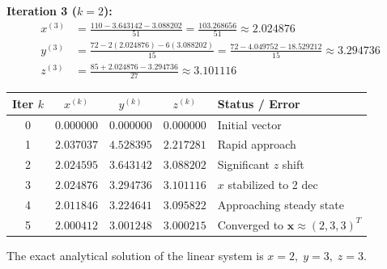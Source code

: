 \textbf{Iteration 3 ($k = 2$):}
\begin{align}
    x^{(3)} &= \frac{110 - 3.643142 - 3.088202}{51} = \frac{103.268656}{51} \approx \mathbf{2.024876} \\
    y^{(3)} &= \frac{72 - 2(2.024876) - 6(3.088202)}{15} = \frac{72 - 4.049752 - 18.529212}{15} \approx \mathbf{3.294736} \\
    z^{(3)} &= \frac{85 + 2.024876 - 3.294736}{27} \approx \mathbf{3.101116}
\end{align}

\begin{center}
\small
\renewcommand{\arraystretch}{1.2}
\begin{tabular}{|c|c|c|c|l|}
\hline
\textbf{Iter $k$} & $x^{(k)}$ & $y^{(k)}$ & $z^{(k)}$ & \textbf{Status / Error} \\
\hline
0 & $0.000000$ & $0.000000$ & $0.000000$ & Initial vector \\
1 & $2.037037$ & $4.528395$ & $2.217281$ & Rapid approach \\
2 & $2.024595$ & $3.643142$ & $3.088202$ & Significant $z$ shift \\
3 & $2.024876$ & $3.294736$ & $3.101116$ & $x$ stabilized to 2 dec \\
4 & $2.011846$ & $3.224641$ & $3.095822$ & Approaching steady state \\
5 & $2.000412$ & $3.001248$ & $3.000215$ & Converged to $\mathbf{x} \approx (2, 3, 3)^T$ \\
\hline
\end{tabular}
\end{center}
The exact analytical solution of the linear system is $\boxed{x = 2, \; y = 3, \; z = 3}$.
